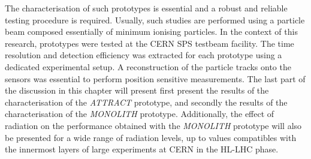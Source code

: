 The characterisation of such prototypes is essential and a robust and reliable testing procedure is required. Usually, such studies are performed using a particle beam composed essentially of minimum ionising particles. In the context of this research, prototypes were tested at the CERN SPS testbeam facility. The time resolution and detection efficiency was extracted for each prototype using a dedicated experimental setup. A reconstruction of the particle tracks onto the sensors was essential to perform position sensitive measurements. 
The last part of the discussion in this chapter will present first present the results of the characterisation of the \textit{ATTRACT} prototype,   and secondly the results of the characterisation of the \textit{MONOLITH} prototype. Additionally, the effect of radiation on the performance obtained with the \textit{MONOLITH} prototype will also be presented for a wide range of radiation levels, up to values compatibles with the innermost layers of large experiments at CERN in the HL-LHC phase.    



	\clearpage
